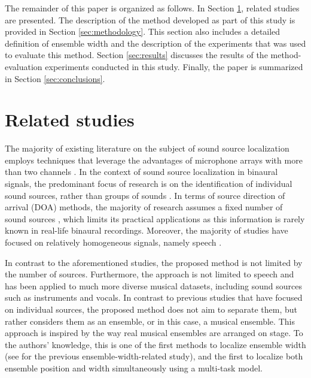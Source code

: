 \documentclass{article}
\begin{document}
The remainder of this paper is organized as follows. In Section \ref{sec:related-studies}, related studies are presented. The description of the method developed as part of this study is provided in Section \ref{sec:methodology}. This section also includes a detailed definition of ensemble width and the description of the experiments that was used to evaluate this method. Section \ref{sec:results} discusses the results of the method-evaluation experiments conducted in this study. Finally, the paper is summarized in Section \ref{sec:conclusions}.

\section{Related studies}
\label{sec:related-studies}

The majority of existing literature on the subject of sound source localization employs techniques that leverage the advantages of microphone arrays with more than two channels \cite{kaveh_statistical_1986, pavlidi_real-time_2012, pan_multi-tone_2021, hahmann_sound_2022, chung_sound_2022, liu_sound_2022}. In the context of sound source localization in binaural signals, the predominant focus of research is on the identification of individual sound sources, rather than groups of sounds \cite{dietz_auditory_2011, may_probabilistic_2011, may_binaural_2012, woodruff_binaural_2012, may_robust_2015, ma16c_interspeech, ma_exploiting_2017, benaroya_binaural_2018}. In terms of source direction of arrival (DOA) methods, the majority of research assumes a fixed number of sound sources \cite{pang_multitask_2019, vecchiotti19, ma_exploiting_2017, woodruff_binaural_2012, s_spatiogram_2021}, which limits its practical applications as this information is rarely known in real-life binaural recordings. Moreover, the majority of studies have focused on relatively homogeneous signals, namely speech \cite{dietz_auditory_2011, may_probabilistic_2011, may_binaural_2012, woodruff_binaural_2012, may_robust_2015, ma16c_interspeech, ma_exploiting_2017, benaroya_binaural_2018, wang_binaural_2020, liu_multiple_2018, yang_deepear_2022, ma_robust_2018}.

In contrast to the aforementioned studies, the proposed method is not limited by the number of sources. Furthermore, the approach is not limited to speech and has been applied to much more diverse musical datasets, including sound sources such as instruments and vocals. In contrast to previous studies that have focused on individual sources, the proposed method does not aim to separate them, but rather considers them as an ensemble, or in this case, a musical ensemble. This approach is inspired by the way real musical ensembles are arranged on stage. To the authors' knowledge, this is one of the first methods to localize ensemble width (see \cite{antoniuk2023blind} for the previous ensemble-width-related study), and the first to localize both ensemble position and width simultaneously using a multi-task model.
\end{document}
